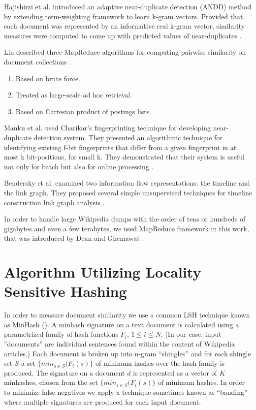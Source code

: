 \documentclass{acm_proc_article-sp}
\begin{document}
Hajishirzi et al. introduced an adaptive near-duplicate detection (ANDD) method by extending term-weighting framework to learn k-gram vectors. Provided that each document was represented by an informative real k-gram vector, similarity measures were computed to come up with predicted values of near-duplicates \cite{hajishirzi:andd}.

Lin described three MapReduce algorithms for computing pairwise similarity on document collections \cite{lin:brute}.
\begin{enumerate}
\item Based on brute force.
\item Treated as large-scale ad hoc retrieval.
\item Based on Cartesian product of postings lists.
\end{enumerate}

Manku et al. used Charikar's fingerprinting technique for developing near-duplicate detection system. They presented an algorithmic technique for identifying existing f-bit fingerprints that differ from a given fingerprint in at most k bit-positions, for small k. They demonstrated that their system is useful not only for batch but also for online processing \cite{manku:web}.

Bendersky et al. examined two information flow representations: the timeline and the link graph. They proposed several simple unsupervised techniques for timeline construction link graph analysis \cite{bendersky:timeline}.

In order to handle large Wikipedia dumps with the order of tens or hundreds of gigabytes and even a few terabytes, we used MapReduce framework in this work, that was introduced by Dean and Ghemawat \cite{dean:mapreduce}. 

\section{Algorithm Utilizing Locality \\ Sensitive Hashing}

In order to measure document similarity we use a common LSH technique known as MinHash (\cite{broder:resemblance}). A minhash signature on a text document is calculated using a parametrized family of hash functions $F_i$, $1 \le i \le N$. (In our case, input ''documents'' are individual sentences found within the content of Wikipedia articles.) Each document is broken up into n-gram ``shingles'' and for each shingle set $S$ a set $\{min_{s \in S}(F_i(s)\}$ of minimum hashes over the hash family is produced. The signature on a document $d$ is represented as a vector of $K$ minhashes, chosen from the set $\{min_{s \in S}(F_i(s)\}$ of minimum hashes. In order to minimize false negatives we apply a technique sometimes known as ``banding'' \cite{ullman:massive} where multiple signatures are produced for each input document.
\end{document}
